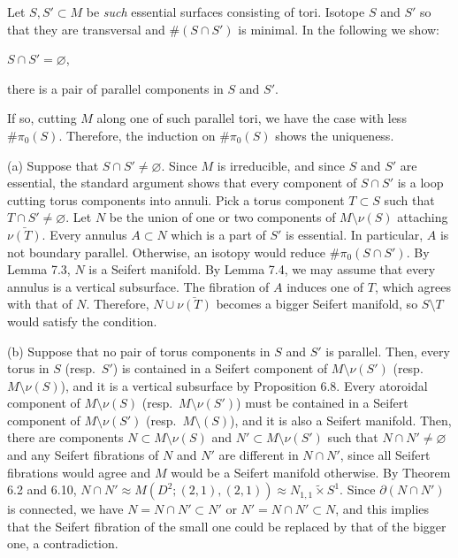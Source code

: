 \documentclass{../../../small}
\begin{document}
\begin{pf}
Let $S,S'\subset M$ be \emph{such} essential surfaces consisting of tori.
Isotope $S$ and $S'$ so that they are transversal and $\#(S\cap S')$ is minimal.
In the following we show:
\begin{parts}
\item $S\cap S'=\varnothing$,
\item there is a pair of parallel components in $S$ and $S'$.
\end{parts}
If so, cutting $M$ along one of such parallel tori, we have the case with less $\#\pi_0(S)$.
Therefore, the induction on $\#\pi_0(S)$ shows the uniqueness.

(a)
Suppose that $S\cap S'\ne\varnothing$.
Since $M$ is irreducible, and since $S$ and $S'$ are essential, the standard argument shows that every component of $S\cap S'$ is a loop cutting torus components into annuli.
Pick a torus component $T\subset S$ such that $T\cap S'\ne\varnothing$.
Let $N$ be the union of one or two components of $M\setminus\nu(S)$ attaching $\bar{\nu(T)}$.
Every annulus $A\subset N$ which is a part of $S'$ is essential.
In particular, $A$ is not boundary parallel.
Otherwise, an isotopy would reduce $\#\pi_0(S\cap S')$.
By Lemma 7.3, $N$ is a Seifert manifold.
By Lemma 7.4, we may assume that every annulus is a vertical subsurface.
The fibration of $A$ induces one of $T$, which agrees with that of $N$.
Therefore, $N\cup\bar{\nu(T)}$ becomes a bigger Seifert manifold, so $S\setminus T$ would satisfy the condition.

(b)
Suppose that no pair of torus components in $S$ and $S'$ is parallel.
Then, every torus in $S$ (resp.~$S'$) is contained in a Seifert component of $M\setminus\nu(S')$ (resp.~$M\setminus\nu(S)$), and it is a vertical subsurface by Proposition 6.8.
Every atoroidal component of $M\setminus\nu(S)$ (resp.~$M\setminus\nu(S')$) must be contained in a Seifert component of $M\setminus\nu(S')$ (resp.~$M\setminus(S)$), and it is also a Seifert manifold.
Then, there are components $N\subset M\setminus\nu(S)$ and $N'\subset M\setminus\nu(S')$ such that $N\cap N'\ne\varnothing$ and any Seifert fibrations of $N$ and $N'$ are different in $N\cap N'$, since all Seifert fibrations would agree and $M$ would be a Seifert manifold otherwise.
By Theorem 6.2 and 6.10, $N\cap N'\approx M(D^2;(2,1),(2,1))\approx N_{1,1}\tilde\times S^1$.
Since $\partial(N\cap N')$ is connected, we have $N=N\cap N'\subset N'$ or $N'=N\cap N'\subset N$, and this implies that the Seifert fibration of the small one could be replaced by that of the bigger one, a contradiction.
\end{pf}
\end{document}
